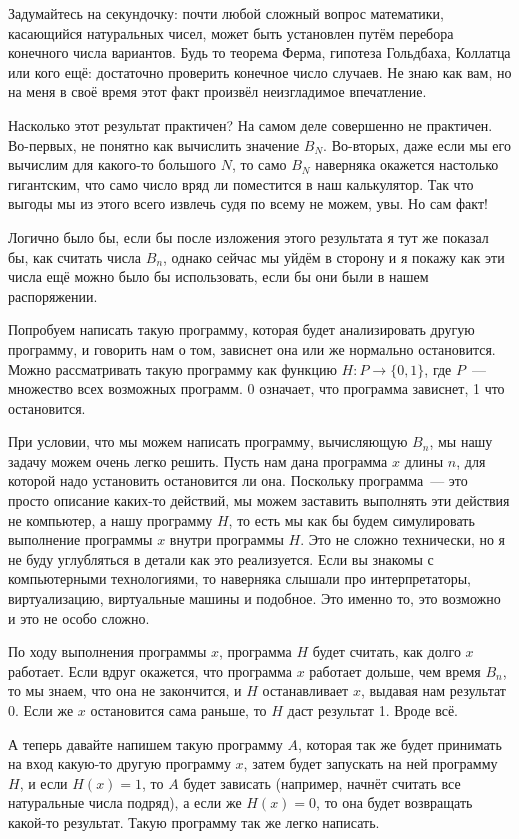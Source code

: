 Задумайтесь на секундочку: почти любой сложный вопрос математики, касающийся натуральных чисел, может быть установлен путём перебора конечного числа вариантов. Будь то теорема Ферма, гипотеза Гольдбаха, Коллатца или кого ещё: достаточно проверить конечное число случаев. Не знаю как вам, но на меня в своё время этот факт произвёл неизгладимое впечатление.

Насколько этот результат практичен? На самом деле совершенно не практичен. Во-первых, не понятно как вычислить значение $B_N$. Во-вторых, даже если мы его вычислим для какого-то большого $N$, то само $B_N$ наверняка окажется настолько гигантским, что само число вряд ли поместится в наш калькулятор. Так что выгоды мы из этого всего извлечь судя по всему не можем, увы. Но сам факт!

Логично было бы, если бы после изложения этого результата я тут же показал бы, как считать числа $B_n$, однако сейчас мы уйдём в сторону и я покажу как эти числа ещё можно было бы использовать, если бы они были в нашем распоряжении.

Попробуем написать такую программу, которая будет анализировать другую программу, и говорить нам о том, зависнет она или же нормально остановится. Можно рассматривать такую программу как функцию $H:P\to\{0,1\}$, где $P$~--- множество всех возможных программ. 0 означает, что программа зависнет, 1 что остановится.

При условии, что мы можем написать программу, вычисляющую $B_n$, мы нашу задачу можем очень легко решить. Пусть нам дана программа $x$ длины $n$, для которой надо установить остановится ли она. Поскольку программа~--- это просто описание каких-то действий, мы можем заставить выполнять эти действия не компьютер, а нашу программу $H$, то есть мы как бы будем симулировать выполнение программы $x$ внутри программы $H$. Это не сложно технически, но я не буду углубляться в детали как это реализуется. Если вы знакомы с компьютерными технологиями, то наверняка слышали про интерпретаторы, виртуализацию, виртуальные машины и подобное. Это именно то, это возможно и это не особо сложно.

По ходу выполнения программы $x$, программа $H$ будет считать, как долго $x$ работает. Если вдруг окажется, что программа $x$ работает дольше, чем время $B_n$, то мы знаем, что она не закончится, и $H$ останавливает $x$, выдавая нам результат 0. Если же $x$ остановится сама раньше, то $H$ даст результат 1. Вроде всё.

А теперь давайте напишем такую программу $A$, которая так же будет принимать на вход какую-то другую программу $x$, затем будет запускать на ней программу $H$, и если $H(x)=1$, то $A$ будет зависать (например, начнёт считать все натуральные числа подряд), а если же $H(x)=0$, то она будет возвращать какой-то результат. Такую программу так же легко написать.

